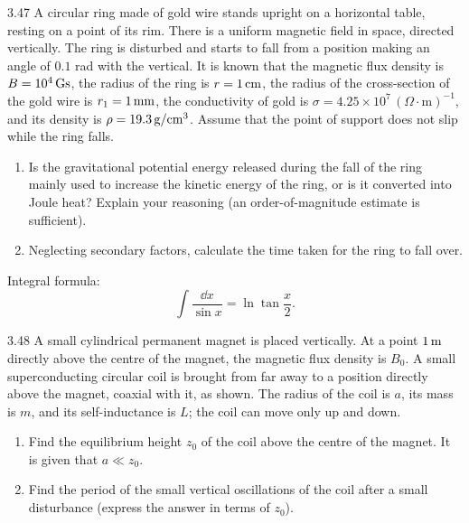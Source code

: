 \begin{problem}{3.47}
A circular ring made of gold wire stands upright on a horizontal table, resting on a point of its rim. There is a uniform magnetic field in space, directed vertically. The ring is disturbed and starts to fall from a position making an angle of $0.1$ rad with the vertical. It is known that the magnetic flux density is $B=10^4\,\mathrm{Gs}$, the radius of the ring is $r=1\,\mathrm{cm}$, the radius of the cross-section of the gold wire is $r_1=1\,\mathrm{mm}$, the conductivity of gold is $\sigma=4.25\times10^7\,(\Omega\cdot\mathrm{m})^{-1}$, and its density is $\rho=19.3\,\mathrm{g/cm^3}$. Assume that the point of support does not slip while the ring falls.
\begin{enumerate}[label=(\arabic*),leftmargin=2.2em,itemsep=1pt,topsep=2pt]
\item Is the gravitational potential energy released during the fall of the ring mainly used to increase the kinetic energy of the ring, or is it converted into Joule heat? Explain your reasoning (an order-of-magnitude estimate is sufficient).
\item Neglecting secondary factors, calculate the time taken for the ring to fall over.
\end{enumerate}

Integral formula:
\begin{equation*}
\int\dfrac{\dd x}{\sin x}=\ln\tan\dfrac{x}{2}.
\end{equation*}
\end{problem}

\begin{problem}{3.48}
A small cylindrical permanent magnet is placed vertically. At a point $1\,\mathrm{m}$ directly above the centre of the magnet, the magnetic flux density is $B_0$. A small superconducting circular coil is brought from far away to a position directly above the magnet, coaxial with it, as shown. The radius of the coil is $a$, its mass is $m$, and its self-inductance is $L$; the coil can move only up and down.
\begin{enumerate}[label=(\arabic*),leftmargin=2.2em,itemsep=1pt,topsep=2pt]
\item Find the equilibrium height $z_0$ of the coil above the centre of the magnet. It is given that $a\ll z_0$.
\item Find the period of the small vertical oscillations of the coil after a small disturbance (express the answer in terms of $z_0$).
\end{enumerate}
\end{problem}

